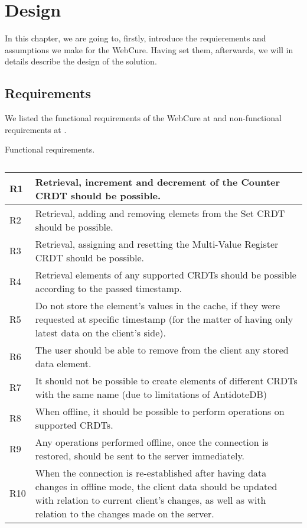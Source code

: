 \chapter{Design}
\label{Design}

In this chapter, we are going to, firstly, introduce the requierements and assumptions we make for the WebCure. Having set them, afterwards, we will in details describe the design of the solution.

\section{Requirements}
\label{4-Requirements}

We listed the functional requirements of the WebCure at  and non-functional requirements at .

\begin{table}[!htbp]
\centering
\caption{Functional requirements.}
\label{table:req1}
\begin{tabular}{|p{1cm}|p{14cm}|}
\hline
R1 & Retrieval, increment and decrement of the Counter CRDT should be possible.                         \\ \hline
R2 & Retrieval, adding and removing elemets from the Set CRDT should be possible.                       \\ \hline
R3 & Retrieval, assigning and resetting the Multi-Value Register CRDT should be possible.               \\ \hline
R4 & Retrieval elements of any supported CRDTs should be possible according to the passed timestamp. \\ \hline
R5 & Do not store the element's values in the cache, if they were requested at specific timestamp (for the matter of having only latest data on the client's side). \\ \hline
R6 & The user should be able to remove from the client any stored data element. \\ \hline
R7 & It should not be possible to create elements of different CRDTs with the same name (due to limitations of AntidoteDB) \\ \hline
R8 & When offline, it should be possible to perform operations on supported CRDTs. \\ \hline
R9 & Any operations performed offline, once the connection is restored, should be sent to the server immediately. \\ \hline
R10 & When the connection is re-established after having data changes in offline mode, the client data should be updated with relation to current client's changes, as well as with relation to the changes made on the server. \\ \hline
\end{tabular}
\caption*{}
\end{table}

